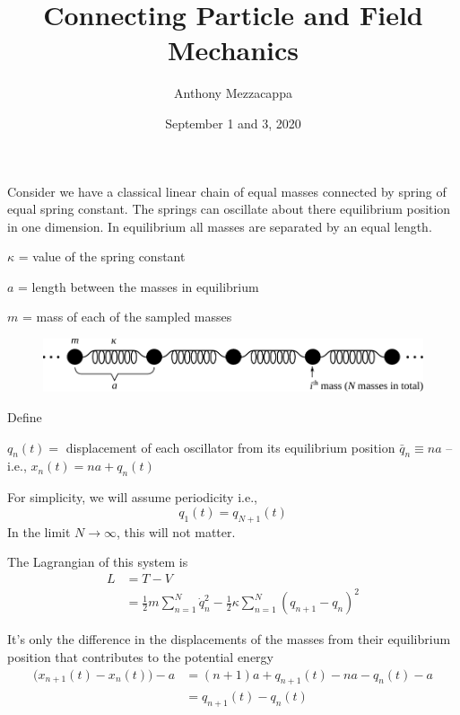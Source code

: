 \documentclass{article}
\title{Connecting Particle and Field Mechanics}
\author{Anthony Mezzacappa}
\date{September 1 and 3, 2020}
\begin{document}
\setlength{\parskip}{1em}

\maketitle

\noindent Consider we have a classical linear chain of equal masses connected by spring of equal spring constant. The springs can oscillate about there equilibrium position in one dimension. In equilibrium all masses are separated by an equal length. \par

$\kappa$ = value of the spring constant \par
$a$ = length between the masses in equilibrium\par
$m$ = mass of each of the sampled masses\par

\begin{figure}[h!]
    \centering
    \includegraphics[width=\textwidth]{pics/04-linear-chain.pdf}
    \label{fig:l4-linear-chain}
\end{figure}

\noindent Define \par
\noindent $q_n(t) =$ displacement of each oscillator from its equilibrium position $\bar{q}_n \equiv na $ -- i.e., $x_n(t) = na+q_n(t)$

\noindent For simplicity, we will assume periodicity i.e.,
\begin{equation*}
    q_1(t) =q_{N+1}(t)
\end{equation*}
In the limit $N \rightarrow \infty$, this will not matter.


\noindent The Lagrangian of this system is
\begin{align*}
    L &= T - V \\
    &= \frac{1}{2} m \sum_{n=1}^N \dot{q}_n^2 - \frac{1}{2} \kappa \sum_{n=1}^N (q_{n+1} - q_n)^2
\end{align*}

\noindent It's only the difference in the displacements of the masses from their equilibrium position that contributes to the potential energy
\begin{align*}
    \big( x_{n+1} (t) - x_n (t) \big) - a &= ( n + 1 ) a + q_{n+1} (t) - n a - q_n (t) - a \\
    &= q_{n+1} (t) - q_n (t)
\end{align*}
\end{document}
